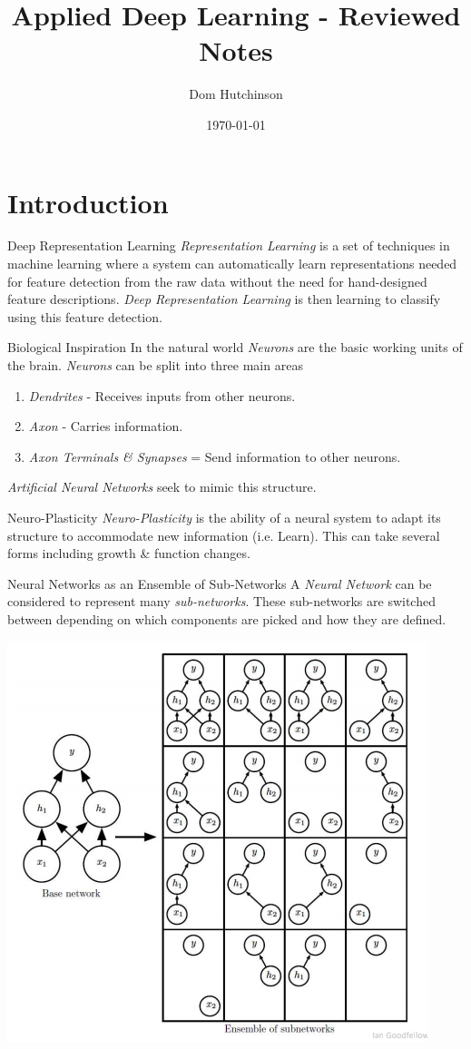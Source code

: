 \documentclass[11pt,a4paper]{article}
\begin{document}
\title{Applied Deep Learning - Reviewed Notes}
\author{Dom Hutchinson}
\date{\today}
\maketitle

\tableofcontents\newpage

\section{Introduction} \label{sec_Introduction}

  \begin{definition}{Deep Representation Learning}
    \textit{Representation Learning} is a set of techniques in machine learning where a system can automatically learn representations needed for feature detection from the raw data without the need for hand-designed feature descriptions. \textit{Deep Representation Learning} is then learning to classify using this feature detection.
  \end{definition}

  \begin{remark}{Biological Inspiration}
    In the natural world \textit{Neurons} are the basic working units of the brain. \textit{Neurons} can be split into three main areas
    \begin{enumerate}
      \item \textit{Dendrites} - Receives inputs from other neurons.
      \item \textit{Axon} - Carries information.
      \item \textit{Axon Terminals \& Synapses} = Send information to other neurons.
    \end{enumerate}
    \textit{Artificial Neural Networks} seek to mimic this structure.
  \end{remark}

  \begin{definition}{Neuro-Plasticity}
    \textit{Neuro-Plasticity} is the ability of a neural system to adapt its structure to accommodate new information (i.e. Learn). This can take several forms including growth \& function changes.
  \end{definition}

  \begin{proposition}{Neural Networks as an Ensemble of Sub-Networks}
    A \textit{Neural Network} can be considered to represent many \textit{sub-networks}. These sub-networks are switched between depending on which components are picked and how they are defined.
    \begin{center}
      \includegraphics[width=.35\textwidth]{SubNeuralNetworks.PNG}
    \end{center}
  \end{proposition}
\end{document}
